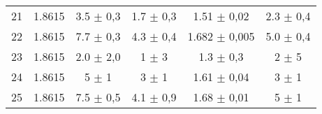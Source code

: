 \begin{landscape}
\begin{table}[h]
\begin{center}
\begin{tabular}{c S[table-format=1.4] S[table-format=1.1] S[table-format=1.2] S[table-format=1.3] S[table-format=1.2]}
21  & 1.8615  & 3.5 $\pm$ 0,3  & 1.7  $\pm$ 0,3  & 1.51   $\pm$ 0,02  &  2.3 $\pm$   0,4\\
22  & 1.8615  & 7.7 $\pm$ 0,3  & 4.3  $\pm$ 0,4  & 1.682  $\pm$ 0,005 &  5.0 $\pm$   0,4\\
23  & 1.8615  & 2.0 $\pm$ 2,0  & 1    $\pm$ 3    & 1.3    $\pm$ 0,3   &  2   $\pm$   5\\
24  & 1.8615  & 5   $\pm$ 1    & 3    $\pm$ 1    & 1.61   $\pm$ 0,04  &  3   $\pm$   1 \\
25  & 1.8615  & 7.5 $\pm$ 0,5  & 4.1  $\pm$ 0,9  & 1.68   $\pm$ 0,01  &  5   $\pm$   1 \\
		\bottomrule
           \bottomrule
            \end{tabular}
        \end{center}
    \end{table}
\end{landscape}
